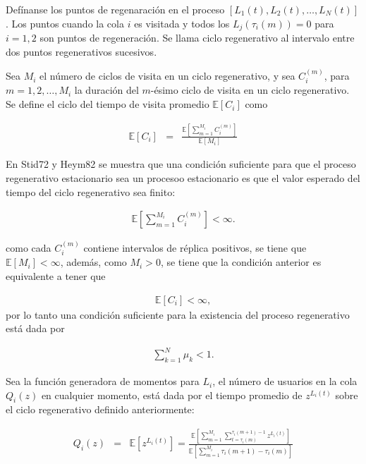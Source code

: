 \documentclass{article}
\newcommand{\esp}{\mathbb{E}}
\begin{document}
Def\'inanse los puntos de regenaraci\'on  en el proceso $\left[L_{1}\left(t\right),L_{2}\left(t\right),\ldots,L_{N}\left(t\right)\right]$. Los puntos cuando la cola $i$ es visitada y todos los $L_{j}\left(\tau_{i}\left(m\right)\right)=0$ para $i=1,2$  son puntos de regeneraci\'on. Se llama ciclo regenerativo al intervalo entre dos puntos regenerativos sucesivos.

Sea $M_{i}$  el n\'umero de ciclos de visita en un ciclo regenerativo, y sea $C_{i}^{(m)}$, para $m=1,2,\ldots,M_{i}$ la duraci\'on del $m$-\'esimo ciclo de visita en un ciclo regenerativo. Se define el ciclo del tiempo de visita promedio $\esp\left[C_{i}\right]$ como

\begin{eqnarray*}
\esp\left[C_{i}\right]&=&\frac{\esp\left[\sum_{m=1}^{M_{i}}C_{i}^{(m)}\right]}{\esp\left[M_{i}\right]}
\end{eqnarray*}


En Stid72 y Heym82 se muestra que una condici\'on suficiente para que el proceso regenerativo 
estacionario sea un procesoo estacionario es que el valor esperado del tiempo del ciclo regenerativo sea finito:

\begin{eqnarray*}
\esp\left[\sum_{m=1}^{M_{i}}C_{i}^{(m)}\right]<\infty.
\end{eqnarray*}

como cada $C_{i}^{(m)}$ contiene intervalos de r\'eplica positivos, se tiene que $\esp\left[M_{i}\right]<\infty$, adem\'as, como $M_{i}>0$, se tiene que la condici\'on anterior es equivalente a tener que 

\begin{eqnarray*}
\esp\left[C_{i}\right]<\infty,
\end{eqnarray*}
por lo tanto una condici\'on suficiente para la existencia del proceso regenerativo est\'a dada por

\begin{eqnarray*}
\sum_{k=1}^{N}\mu_{k}<1.
\end{eqnarray*}

Sea la funci\'on generadora de momentos para $L_{i}$, el n\'umero de usuarios en la cola $Q_{i}\left(z\right)$ en cualquier momento, est\'a dada por el tiempo promedio de $z^{L_{i}\left(t\right)}$ sobre el ciclo regenerativo definido anteriormente:

\begin{eqnarray*}
Q_{i}\left(z\right)&=&\esp\left[z^{L_{i}\left(t\right)}\right]=\frac{\esp\left[\sum_{m=1}^{M_{i}}\sum_{t=\tau_{i}\left(m\right)}^{\tau_{i}\left(m+1\right)-1}z^{L_{i}\left(t\right)}\right]}{\esp\left[\sum_{m=1}^{M_{i}}\tau_{i}\left(m+1\right)-\tau_{i}\left(m\right)\right]}
\end{eqnarray*}
\end{document}
